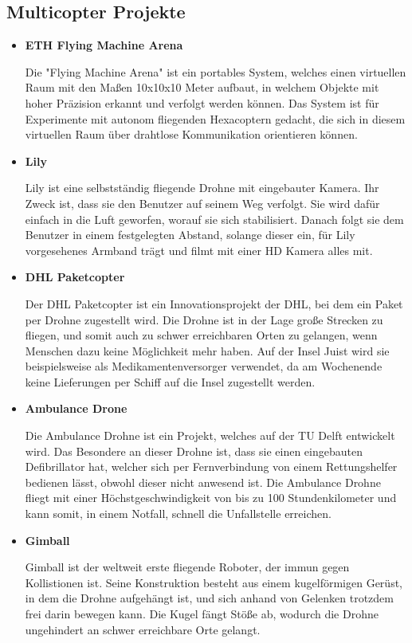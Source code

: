   \subsection*{Multicopter Projekte}
  \begin{itemize}
      \item \textbf{ETH Flying Machine Arena}

      Die {"Flying Machine Arena"\cite{eth}} ist ein portables System, welches einen virtuellen Raum mit den Maßen 10x10x10 Meter aufbaut, in welchem
      Objekte mit hoher Präzision erkannt und verfolgt werden können. Das System ist für Experimente mit autonom fliegenden Hexacoptern
      gedacht, die sich in diesem virtuellen Raum über drahtlose Kommunikation orientieren können.

      \item \textbf{Lily}

      {Lily\cite{lily}} ist eine selbstständig fliegende Drohne mit eingebauter Kamera. Ihr Zweck ist, dass sie den Benutzer auf seinem Weg verfolgt.
      Sie wird dafür einfach in die Luft geworfen, worauf sie sich stabilisiert. Danach folgt sie dem Benutzer in einem festgelegten Abstand, solange dieser ein, für Lily
      vorgesehenes Armband trägt und filmt mit einer HD Kamera alles mit.

      \item \textbf{DHL Paketcopter}

      Der {DHL Paketcopter\cite{dhl}} ist ein Innovationsprojekt der DHL, bei dem ein Paket per Drohne zugestellt wird. Die Drohne ist in der Lage große Strecken zu fliegen,
      und somit auch zu schwer erreichbaren Orten zu gelangen, wenn Menschen dazu keine Möglichkeit mehr haben. Auf der Insel Juist wird sie beispielsweise als
      Medikamentenversorger verwendet, da am Wochenende keine Lieferungen per Schiff auf die Insel zugestellt werden.

      \item \textbf{Ambulance Drone}

      Die {Ambulance Drohne\cite{ambulancedrone}} ist ein Projekt, welches auf der TU Delft entwickelt wird. Das Besondere an dieser Drohne ist, dass sie einen eingebauten Defibrillator hat, welcher
      sich per Fernverbindung von einem Rettungshelfer bedienen lässt, obwohl dieser nicht anwesend ist. Die Ambulance Drohne fliegt mit einer Höchstgeschwindigkeit von bis zu
      100 Stundenkilometer und kann somit, in einem Notfall, schnell die Unfallstelle erreichen.

      \item \textbf{Gimball}

      {Gimball\cite{gimball}} ist der weltweit erste fliegende Roboter, der immun gegen Kollistionen ist. Seine Konstruktion besteht aus einem kugelförmigen Gerüst, in dem die Drohne
      aufgehängt ist, und sich anhand von Gelenken trotzdem frei darin bewegen kann. Die Kugel fängt Stöße ab, wodurch die Drohne ungehindert an schwer erreichbare
      Orte gelangt.

  \end{itemize}

